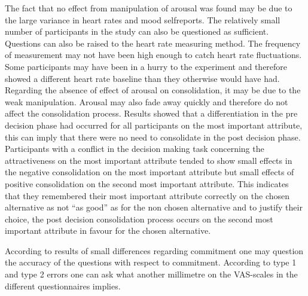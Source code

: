 The fact that no effect from manipulation of arousal was found may be
due to the large variance in heart rates and mood selfreports.  The
relatively small number of participants in the study can also be
questioned as sufficient.  Questions can also be raised to the heart
rate measuring  method.   The frequency of measurement may not have
been high enough to catch heart rate fluctuations.  Some participants
may have been in a hurry to the experiment and therefore showed a
different heart rate baseline than they otherwise would have had.
Regarding the absence of effect of arousal on consolidation, it may be
due to the weak manipulation.  Arousal may also fade away quickly and
therefore do not affect the consolidation process.  Results showed
that a differentiation in the pre decision phase had occurred for all
participants on the most important attribute, this can imply that
there were no need to consolidate in the post decision phase.
Participants with a conflict in the decision making task concerning
the attractiveness on the most important attribute tended to show
small effects in the negative consolidation on the most important
attribute but small effects of positive consolidation on the second
most important attribute. This indicates that they remembered their
most important attribute correctly on the chosen alternative as not
``as good'' as for the non chosen alternative and to justify their
choice, the post decision consolidation process occurs on the second
most important attribute in favour for the chosen alternative.

According to results of small differences regarding commitment  one
may question the accuracy of the questions with respect to
commitment.  According to type 1 and type 2 errors one can ask what
another millimetre on the VAS-scales in the different questionnaires
implies.

